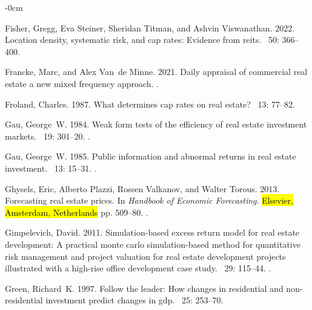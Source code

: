 \documentclass[jrfm,article,accept,oneauthor,pdftex]{Definitions/mdpi}
\begin{document}
\begin{adjustwidth}{-\extralength}{0cm}
\begin{thebibliography}{999}
Fisher, Gregg, Eva Steiner, Sheridan Titman, and Ashvin Viswanathan. 2022.
\newblock Location density, systematic risk, and cap rates: Evidence from
  reits.
~{50\/}: 366--400.

Francke, Marc, and Alex Van~de Minne. 2021.
\newblock Daily appraisal of commercial real estate a new mixed frequency
  approach.
.

Froland, Charles. 1987.
\newblock What determines cap rates on real estate?
~{13\/}: 77--82.

Gau, George~W. 1984.
\newblock Weak form tests of the efficiency of real estate investment markets.
~{19\/}: 301--20.
.

Gau, George~W. 1985.
\newblock Public information and abnormal returns in real estate investment.
~{13\/}: 15--31.
.

Ghysels, Eric, Alberto Plazzi, Rossen Valkanov, and Walter Torous. 2013.
\newblock Forecasting real estate prices.
In  {\em Handbook of Economic Forecasting\/}. \hl{Elsevier, Amsterdam, Netherlands} %
 pp. 509--80.
.

Gimpelevich, David. 2011.
\newblock Simulation-based excess return model for real estate development: A
  practical monte carlo simulation-based method for quantitative risk
  management and project valuation for real estate development projects
  illustrated with a high-rise office development case study.
~{29}: 115--44.
.

Green, Richard~K. 1997.
\newblock Follow the leader: How changes in residential and non-residential
  investment predict changes in gdp.
~{25\/}:  253--70.


\end{thebibliography}
\end{adjustwidth}
\end{document}
